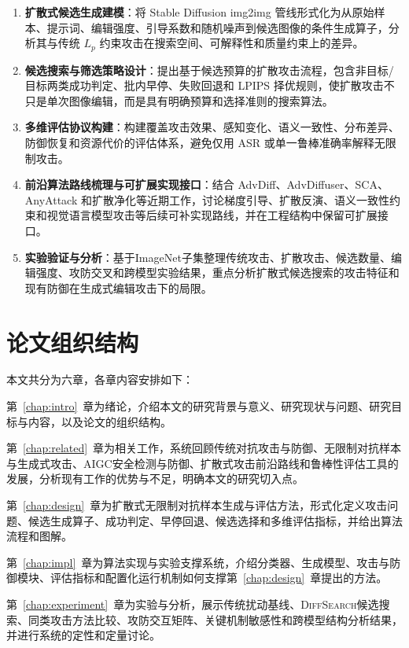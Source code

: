 \documentclass[type=bachelor,oneside]{fduthesis}
\newcommand{\methodname}{\textsc{DiffSearch}}
\begin{document}
\begin{enumerate}[label=(\arabic*)]
  \item \textbf{扩散式候选生成建模}：将 Stable Diffusion img2img 管线形式化为从原始样本、提示词、编辑强度、引导系数和随机噪声到候选图像的条件生成算子，分析其与传统 $L_p$ 约束攻击在搜索空间、可解释性和质量约束上的差异。
  \item \textbf{候选搜索与筛选策略设计}：提出基于候选预算的扩散攻击流程，包含非目标/目标两类成功判定、批内早停、失败回退和 LPIPS 择优规则，使扩散攻击不只是单次图像编辑，而是具有明确预算和选择准则的搜索算法。
  \item \textbf{多维评估协议构建}：构建覆盖攻击效果、感知变化、语义一致性、分布差异、防御恢复和资源代价的评估体系，避免仅用 ASR 或单一鲁棒准确率解释无限制攻击。
  \item \textbf{前沿算法路线梳理与可扩展实现接口}：结合 AdvDiff、AdvDiffuser、SCA、AnyAttack 和扩散净化等近期工作，讨论梯度引导、扩散反演、语义一致性约束和视觉语言模型攻击等后续可补实现路线，并在工程结构中保留可扩展接口。
  \item \textbf{实验验证与分析}：基于ImageNet\cite{deng2009imagenet}子集整理传统攻击、扩散攻击、候选数量、编辑强度、攻防交叉和跨模型实验结果，重点分析扩散式候选搜索的攻击特征和现有防御在生成式编辑攻击下的局限。
\end{enumerate}

\section{论文组织结构}

本文共分为六章，各章内容安排如下：

第~\ref{chap:intro}~章为绪论，介绍本文的研究背景与意义、研究现状与问题、研究目标与内容，以及论文的组织结构。

第~\ref{chap:related}~章为相关工作，系统回顾传统对抗攻击与防御、无限制对抗样本与生成式攻击、AIGC安全检测与防御、扩散式攻击前沿路线和鲁棒性评估工具的发展，分析现有工作的优势与不足，明确本文的研究切入点。

第~\ref{chap:design}~章为扩散式无限制对抗样本生成与评估方法，形式化定义攻击问题、候选生成算子、成功判定、早停回退、候选选择和多维评估指标，并给出算法流程和图解。

第~\ref{chap:impl}~章为算法实现与实验支撑系统，介绍分类器、生成模型、攻击与防御模块、评估指标和配置化运行机制如何支撑第~\ref{chap:design}~章提出的方法。

第~\ref{chap:experiment}~章为实验与分析，展示传统扰动基线、\methodname 候选搜索、同类攻击方法比较、攻防交互矩阵、关键机制敏感性和跨模型结构分析结果，并进行系统的定性和定量讨论。
\end{document}
